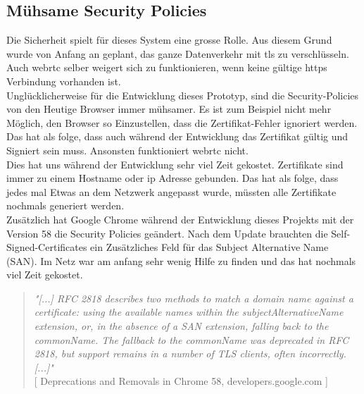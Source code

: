 \subsection{Mühsame Security Policies}
Die Sicherheit spielt für dieses System eine grosse Rolle. Aus diesem Grund wurde von Anfang an geplant, das ganze Datenverkehr mit \gls{tls} zu verschlüsseln. Auch \gls{webrtc} selber weigert sich zu funktionieren, wenn keine gültige \gls{https} Verbindung vorhanden ist.
\\
Unglücklicherweise für die Entwicklung dieses Prototyp, sind die Security-Policies von den Heutige Browser immer mühsamer. Es ist zum Beispiel nicht mehr Möglich, den Browser so Einzustellen, dass die Zertifikat-Fehler ignoriert werden. Das hat als folge, dass auch während der Entwicklung das Zertifikat gültig und Signiert sein muss. Ansonsten funktioniert \gls{webrtc} nicht.
\\
Dies hat uns während der Entwicklung sehr viel Zeit gekostet. Zertifikate sind immer zu einem Hostname oder \gls{ip} Adresse gebunden. Das hat als folge, dass jedes mal Etwas an dem Netzwerk angepasst wurde, müssten alle Zertifikate nochmals generiert werden.
\\
Zusätzlich hat Google Chrome während der Entwicklung dieses Projekts mit der Version 58 die Security Policies geändert. Nach dem Update brauchten die Self-Signed-Certificates ein Zusätzliches Feld für das Subject Alternative Name (SAN). Im Netz war am anfang sehr wenig Hilfe zu finden und das hat nochmals viel Zeit gekostet.


\begin{quote}
	\textit{
		"[...] RFC 2818 describes two methods to match a domain name against a certificate: using the available names within the subjectAlternativeName extension, or, in the absence of a SAN extension, falling back to the commonName. The fallback to the commonName was deprecated in RFC 2818, but support remains in a number of TLS clients, often incorrectly. [...]"
	} 
	\\
	\nocite{} [ Deprecations and Removals in Chrome 58, developers.google.com ]
\end{quote}

